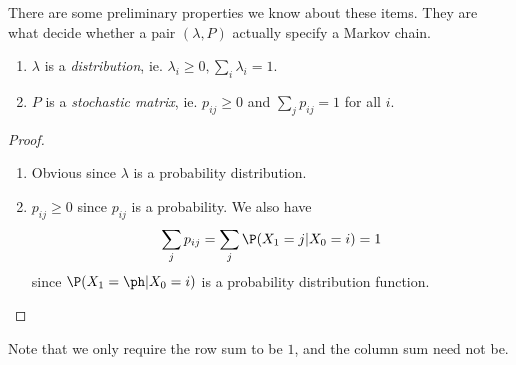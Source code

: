 \documentclass[a4paper]{article}
\begin{document}
There are some preliminary properties we know about these items. They are what decide whether a pair $(\lambda, P)$ actually specify a Markov chain.
\begin{prop}\leavevmode
  \begin{enumerate}
    \item $\lambda$ is a \emph{distribution}, ie. $\lambda_i \geq 0, \sum_i \lambda_i = 1$.
    \item $P$ is a \emph{stochastic matrix}, ie. $p_{ij} \geq 0$ and $\sum_j p_{ij} = 1$ for all $i$.
  \end{enumerate}
\end{prop}

\begin{proof}\leavevmode
  \begin{enumerate}
    \item Obvious since $\lambda$ is a probability distribution.
    \item $p_{ij} \geq 0$ since $p_{ij}$ is a probability. We also have
      \[
        \sum_j p_{ij} = \sum_j \P(X_{1} = j | X_0 = i) = 1
      \]
      since $\P(X_1 = \ph | X_0 = i)$ is a probability distribution function.
  \end{enumerate}
\end{proof}
Note that we only require the row sum to be $1$, and the column sum need not be.
\end{document}
